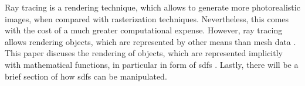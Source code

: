 

Ray tracing is a rendering technique, which allows to generate more photorealistic images, when compared with rasterization techniques. Nevertheless, this comes with the cost of a much greater computational expense. However, ray tracing allows rendering objects, which are represented by other means than mesh data \cite{bungartz:2013:einfuhrung}. This paper discuses the rendering of objects, which are represented implicitly with mathematical functions, in particular in form of \glspl{sdf} \cite{osher:2006:level}. Lastly, there will be a brief section of how \glspl{sdf} can be manipulated.

